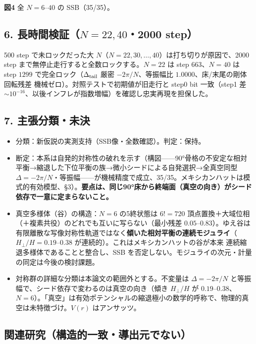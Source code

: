 \documentclass[
  a4paper,
]{ltjsarticle}
\providecommand{\tightlist}{%
  \setlength{\itemsep}{0pt}\setlength{\parskip}{0pt}}
\begin{document}
\textbf{図4} 全 \(N=6\)--\(40\) の SSB（35/35）。

\subsection{\texorpdfstring{6. 長時間検証（\(N=22,40\)・2000
step）}{6. 長時間検証（N=22,40・2000 step）}}\label{ux9577ux6642ux9593ux691cux8a3cn22402000-step}

500 step で未ロックだった大
\(N\)（\(N=22,30,\ldots,40\)）は打ち切りが原因で、2000 step
まで無停止走行すると全数ロックする。\(N=22\) は step \(663\)、\(N=40\)
は step \(1299\) で完全ロック（\(\Delta_{\rm tail}\) 厳密
\(-2\pi/N\)、等振幅比 \(1.0000\)、床/末尾の剛体回転残差
機械ゼロ）。対照テストで初期値が旧走行と step0 bit 一致（step1 差
\(\sim10^{-16}\)、以後インフレが指数増幅）を確認し忠実再現を担保した。

\subsection{7.
主張分類・未決}\label{ux4e3bux5f35ux5206ux985eux672aux6c7a}

\begin{itemize}
\tightlist
\item
  分類：新仮説の実測支持（SSB像・全数確認）。判定：保持。
\item
  断定：本系は自発的対称性の破れを示す（構図------90°骨格の不安定な相対平衡→縮退した下位平衡の族→微小シードによる自発選択→全真空同型
  \(\Delta=-2\pi/N\)・等振幅------が機械精度で成立、35/35。メキシカンハットは模式的有効模型、§3）。\textbf{要点は、同じ90°床から終端面（真空の向き）がシード依存で一意に定まらないこと。}
\item
  真空多様体（谷）の構造：\(N=6\) の5終状態は \(6!=720\)
  頂点置換＋大域位相（＋複素共役）のどれでも互いに写らない（最小残差
  \(0.05\)--\(0.83\)）。ゆえ谷は有限離散な写像対称性軌道ではなく\textbf{傾いた相対平衡の連続モジュライ}（\(H_\perp/H=0.19\)--\(0.38\)
  が連続的）。これはメキシカンハットの谷が本来
  連続縮退多様体であることと整合し、SSB
  を否定しない。モジュライの次元・計量の同定は今後の検討課題。
\item
  対称群の詳細な分類は本論文の範囲外とする。不変量は \(\Delta=-2\pi/N\)
  と等振幅で、シード依存で変わるのは真空の向き（傾き \(H_\perp/H\) が
  \(0.19\)--\(0.38\)、\(N=6\)）。「真空」は有効ポテンシャルの縮退極小の数学的呼称で、物理的真空は未特徴づけ。\(V(r)\)
  はアンサッツ。
\end{itemize}

\subsection{関連研究（構造的一致・導出元でない）}\label{ux95a2ux9023ux7814ux7a76ux69cbux9020ux7684ux4e00ux81f4ux5c0eux51faux5143ux3067ux306aux3044}
\end{document}
